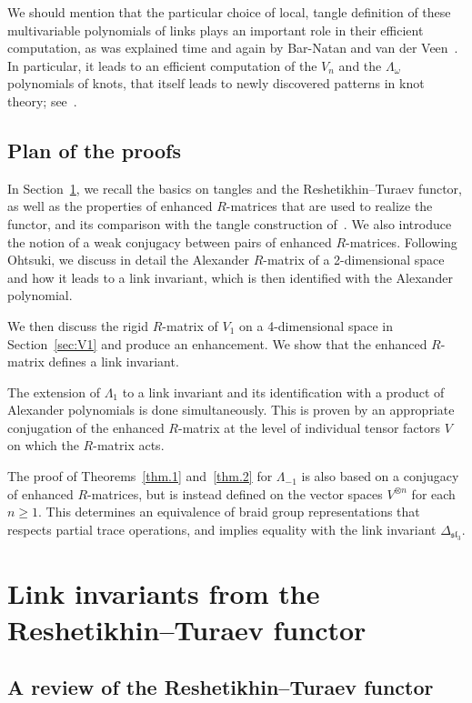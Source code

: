 \documentclass[pdftex]{sigma}
\numberwithin{equation}{section}
\theoremstyle{definition}
\begin{document}
We should mention that the particular choice of local, tangle definition of these multivariable polynomials
of links plays an important role in their efficient computation, as was explained
time and again by Bar-Natan and van der Veen~\cite{BNV:PG,BNV:API}.
In particular, it leads to an efficient computation of the $V_n$ and the
$\Lambda_\omega$ polynomials of knots, that itself leads to newly discovered
patterns in knot theory; see~\cite{GL:patterns}.

\subsection{Plan of the proofs}

In Section~\ref{sec:RT}, we recall the basics on tangles and the Reshetikhin--Turaev
functor, as well as the properties of enhanced $R$-matrices that are
used to realize the functor, and its comparison with the tangle construction of~\cite{GK:multi}. We also introduce the notion of a weak conjugacy between pairs of enhanced $R$-matrices. Following Ohtsuki, we discuss in detail the
Alexander $R$-matrix of a 2-dimensional space and how it leads to a link invariant,
which is then identified with the Alexander polynomial.

We then discuss the rigid $R$-matrix of $V_1$ on a 4-dimensional space in Section~\ref{sec:V1} and produce an enhancement. We show that the enhanced $R$-matrix
defines a link invariant.

The extension of $\Lambda_1$ to a link invariant and its identification with a product
of Alexander polynomials is done simultaneously. This is proven by an appropriate
conjugation of the enhanced $R$-matrix at the level of individual tensor factors $V$
on which the $R$-matrix acts.

The proof of Theorems~\ref{thm.1} and~\ref{thm.2} for $\Lambda_{-1}$ is also based on a conjugacy of enhanced $R$-matrices, but is instead defined on the vector spaces $V^{\otimes n}$ for each $n\geq 1$. This determines an equivalence of braid group representations that respects partial trace operations, and implies equality with the link invariant $\Delta_{\mathfrak{sl}_3}$.


\section{Link invariants from the Reshetikhin--Turaev functor}
\label{sec:RT}

\subsection{A review of the Reshetikhin--Turaev functor}
\label{sub:RT}
\end{document}
